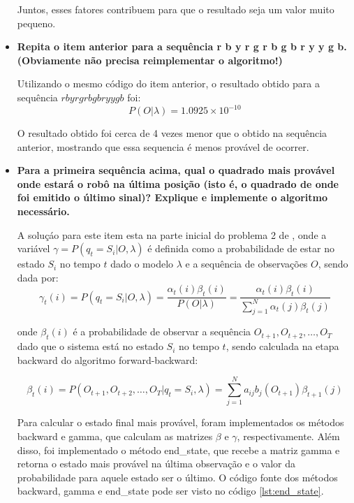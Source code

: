 \begin{itemize}
\begin{tcolorbox}[title=Resposta (continuação):]
        Juntos, esses fatores contribuem para que o resultado seja um valor muito pequeno.
    \end{tcolorbox}

    \item \textbf{Repita o item anterior para a sequência r b y r g r b g b r y y g b. (Obviamente não precisa reimplementar o algoritmo!)}
    \begin{tcolorbox}[title=Resposta:]
        Utilizando o mesmo código do item anterior, o resultado obtido para a sequência \( r b y r g r b g b r y y g b \) foi:
        \begin{equation}
            P(O |  \lambda) = 1.0925 \times 10^{-10}
        \end{equation}

        O resultado obtido foi cerca de 4 vezes menor que o obtido na sequência anterior, mostrando que essa sequencia é menos provável de ocorrer.
    \end{tcolorbox}

    \item \textbf{Para a primeira sequência acima, qual o quadrado mais provável onde estará o robô na última posição (isto é, o quadrado de onde foi emitido o último sinal)? Explique e implemente o algoritmo necessário.}
    \begin{tcolorbox}[title=Resposta:]
        A soluçáo para este item esta na parte inicial do problema 2 de \cite{Rabiner1989}, onde a variável $\gamma = P (q_t = S_i | O, \lambda)$ é definida como a probabilidade de estar no estado $S_i$ no tempo $t$ dado o modelo $\lambda$ e a sequência de observações $O$, sendo dada por:
        \begin{equation}
            \gamma_t(i) = P(q_t = S_i | O, \lambda) = \frac{\alpha_t(i) \beta_t(i)}{P(O | \lambda)} = \frac{\alpha_t(i) \beta_t(i)}{\sum_{j=1}^{N} \alpha_t(j) \beta_t(j)}
        \end{equation}

        onde $\beta_t(i)$ é a probabilidade de observar a sequência $O_{t+1}, O_{t+2}, \ldots, O_T$ dado que o sistema está no estado $S_i$ no tempo $t$, sendo calculada na etapa backward do algoritmo forward-backward:

        \begin{equation}
            \beta_t(i) = P(O_{t+1}, O_{t+2}, \ldots, O_T | q_t = S_i, \lambda) = \sum_{j=1}^{N} a_{ij} b_j(O_{t+1}) \beta_{t+1}(j)
        \end{equation}

        Para calcular o estado final mais provável, foram implementados os métodos backward e gamma, que calculam as matrizes $\beta$ e $\gamma$, respectivamente. Além disso, foi implementado o método end\_state, que recebe a matriz gamma e retorna o estado mais provável na última observação e o valor da probabilidade para aquele estado ser o último. O código fonte dos métodos backward, gamma e end\_state pode ser visto no código \ref{lst:end_state}.
    

\end{tcolorbox}
\end{itemize}
